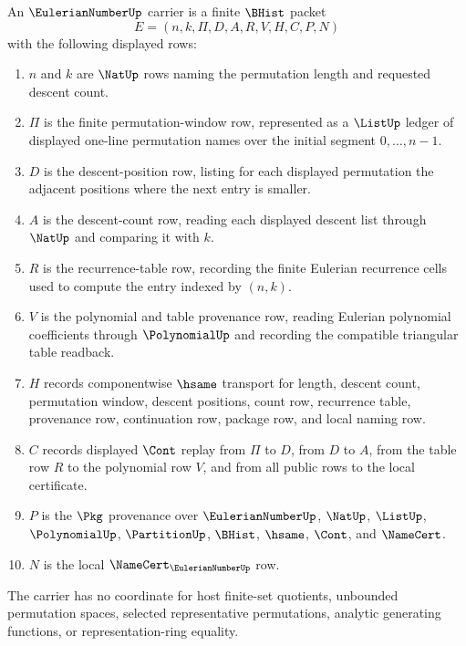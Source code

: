 \begin{definition}
\label{def:eulerian-number-carrier}
An $\EulerianNumberUp$ carrier is a finite $\BHist$ packet
$$
E=(n,k,\Pi,D,A,R,V,H,C,P,N)
$$
with the following displayed rows:
\begin{enumerate}
\item $n$ and $k$ are $\NatUp$ rows naming the permutation length and requested descent count.
\item $\Pi$ is the finite permutation-window row, represented as a $\ListUp$ ledger of displayed one-line permutation names over the initial segment $0,\ldots,n-1$.
\item $D$ is the descent-position row, listing for each displayed permutation the adjacent positions where the next entry is smaller.
\item $A$ is the descent-count row, reading each displayed descent list through $\NatUp$ and comparing it with $k$.
\item $R$ is the recurrence-table row, recording the finite Eulerian recurrence cells used to compute the entry indexed by $(n,k)$.
\item $V$ is the polynomial and table provenance row, reading Eulerian polynomial coefficients through $\PolynomialUp$ and recording the compatible triangular table readback.
\item $H$ records componentwise $\hsame$ transport for length, descent count, permutation window, descent positions, count row, recurrence table, provenance row, continuation row, package row, and local naming row.
\item $C$ records displayed $\Cont$ replay from $\Pi$ to $D$, from $D$ to $A$, from the table row $R$ to the polynomial row $V$, and from all public rows to the local certificate.
\item $P$ is the $\Pkg$ provenance over $\EulerianNumberUp$, $\NatUp$, $\ListUp$, $\PolynomialUp$, $\PartitionUp$, $\BHist$, $\hsame$, $\Cont$, and $\NameCert$.
\item $N$ is the local $\NameCert_{\EulerianNumberUp}$ row.
\end{enumerate}
The carrier has no coordinate for host finite-set quotients, unbounded permutation spaces, selected representative permutations, analytic generating functions, or representation-ring equality.
\end{definition}

